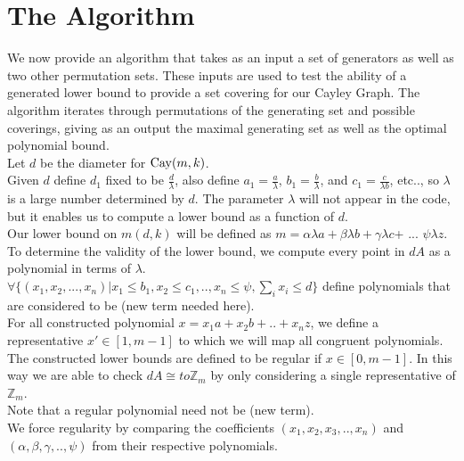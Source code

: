 

\section{The Algorithm}

We now provide an algorithm that takes as an input a set of generators as well as two other permutation sets. These inputs are used to test the ability of a generated lower bound to provide a set covering for our Cayley Graph. The algorithm iterates through permutations of the generating set and possible coverings, giving as an output the maximal generating set as well as the optimal polynomial bound.\\

Let $d$ be the diameter for $\operatorname{Cay}(m, k)$.\\

Given $d$ define $d_{1}$ fixed to be $\frac{d}{\lambda}$, also define $a_{1} = \frac{a}{\lambda}$, $b_{1} = \frac{b}{\lambda}$, and $c_{1} = \frac{c}{\lambda b}$, etc.., so $\lambda$ is a large number determined by $d$. The parameter $\lambda$ will not appear in the code, but it enables us to compute a lower bound as a function of $d$.\\

Our lower bound on $m(d, k)$ will be defined as $m =\alpha \lambda a + \beta \lambda b + \gamma \lambda c$+ ... $\psi \lambda z$.  To determine the validity of the lower bound, we compute every point in $dA$ as a polynomial in terms of $\lambda$.\\

$\forall \{ (x_{1}, x_{2}, ... , x_{n}) \vert x_{1} \leq b_{1}, x_{2} \leq c_{1}, .. , x_{n} \leq \psi, \sum_{i} x_{i} \leq d \}$ define polynomials that are considered to be (new term needed here).\\

For all constructed polynomial $x = x_{1}a + x_{2}b + .. + x_{n}z$, we define a representative $x' \in [1, m-1]$ to which we will map all congruent polynomials.\\

The constructed lower bounds are defined to be regular if $x \in [0, m-1]$. In this way we are able to check $dA \cong to \mathbb{Z}_{m}$ by only considering a single representative of $\mathbb{Z}_{m}$.
\\ Note that a regular polynomial need not be (new term).\\

We force regularity by comparing the coefficients $(x_{1}, x_{2}, x_{3}, .. , x_{n})$ and $(\alpha, \beta, \gamma, .. , \psi)$ from their respective polynomials.\\


